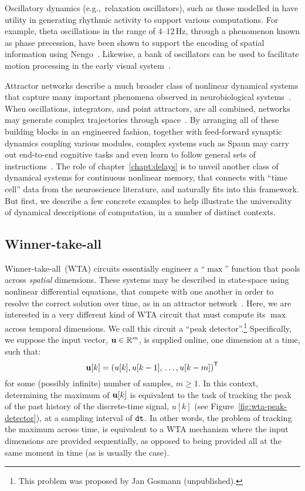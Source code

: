 Oscillatory dynamics (e.g.,~relaxation oscillators), such as those modelled in \citet{eliasmith2000b} have utility in generating rhythmic activity to support various computations.
For example, theta oscillations in the range of $4$--$12$\,Hz, through a phenomenon known as phase precession, have been shown to support the encoding of spatial information using Nengo~\citep{o1993phase, orchard2013does}.
Likewise, a bank of oscillators can be used to facilitate motion processing in the early visual system~\citep{huzook2012}. 

Attractor networks describe a much broader class of nonlinear dynamical systems that capture many important phenomena observed in neurobiological systems~\citep{amit1989modeling, eliasmith2005b}.
When oscillations, integrators, and point attractors, are all combined, networks may generate complex trajectories through space~\citep{ijspeert2013dynamical, dewolf2017}.
By arranging all of these building blocks in an engineered fashion, together with feed-forward synaptic dynamics coupling various modules, complex systems such as Spaun may carry out end-to-end cognitive tasks and even learn to follow general sets of instructions~\citep{eliasmith2012, choo2018}.
The role of chapter~\ref{chapt:delays} is to unveil another class of dynamical systems for continuous nonlinear memory, that connects with ``time cell'' data from the neuroscience literature, and naturally fits into this framework.
But first, we describe a few concrete examples to help illustrate the universality of dynamical descriptions of computation, in a number of distinct contexts.

\subsection{Winner-take-all}

Winner-take-all~(WTA) circuits essentially engineer a ``$\max$'' function that pools across \emph{spatial} dimensions.
These systems may be described in state-space using nonlinear differential equations, that compete with one another in order to resolve the correct solution over time, as in an attractor network~\citep{usher2001time, gosmann2017a}.
Here, we are interested in a very different kind of WTA circuit that must compute its $\max$ across temporal dimensions.
We call this circuit a ``peak detector''.\footnote{%
This problem was proposed by Jan Gosmann (unpublished).}
Specifically, we suppose the input vector, $\mathbf{u} \in \mathbb{R}^m$, is supplied online, one dimension at a time, such that:
$$\mathbf{u}[k] = {\left( u[k] \text{,}\, u[k-1] \text{,}\, \ldots \text{,}\, u[k-m] \right)}^\mathsf{T}$$
for some (possibly infinite) number of samples, $m \ge 1$.
In this context, determining the maximum of $\mathbf{u}[k]$ is equivalent to the task of tracking the peak of the past history of the discrete-time signal, $u[k]$ (see Figure~\ref{fig:wta-peak-detector}), at a sampling interval of $\texttt{dt}{}$.
In other words, the problem of tracking the maximum across time, is equivalent to a WTA mechanism where the input dimensions are provided sequentially, as opposed to being provided all at the same moment in time (as is usually the case).


